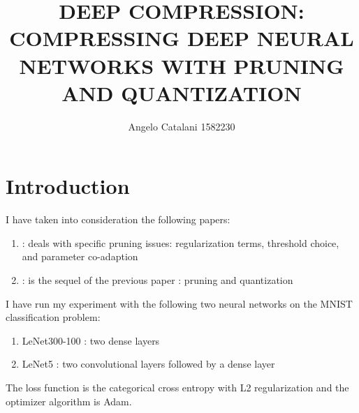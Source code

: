 \documentclass[journal]{vgtc}                %
\title{DEEP COMPRESSION: COMPRESSING DEEP NEURAL NETWORKS WITH PRUNING AND QUANTIZATION}
\author{Angelo Catalani 1582230}
\begin{document}

\maketitle
\section{Introduction}
I have taken into consideration the following papers:
\begin{enumerate}
\item \cite{p1} : deals with specific pruning issues: regularization terms, threshold choice, and  parameter co-adaption
\item \cite{p2} : is the sequel of the previous paper : pruning and quantization
\end{enumerate}
I have run my experiment with the following two neural networks on the MNIST classification problem: 
\begin{enumerate}
\item LeNet300-100 : two dense layers 
\item LeNet5 : two convolutional layers followed by a dense layer
\end{enumerate}
The loss function is the categorical cross entropy with L2 regularization and the optimizer algorithm is Adam.
\end{document}

